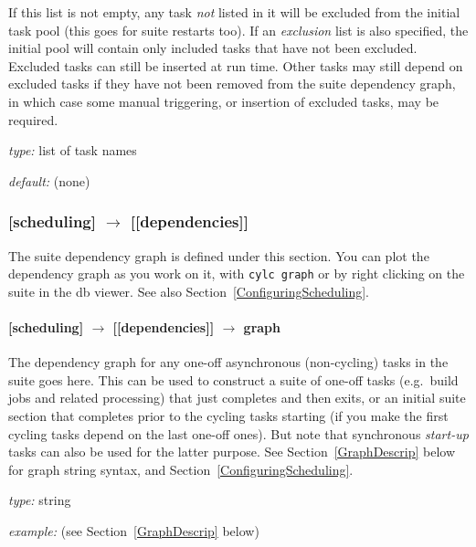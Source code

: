 If this list is not empty, any task {\em not} listed in it will be
excluded from the initial task pool (this goes for suite restarts too).
If an {\em exclusion} list is also specified, the initial pool will
contain only included tasks that have not been excluded. Excluded tasks
can still be inserted at run time. Other tasks may still depend on
excluded tasks if they have not been removed from the suite dependency
graph, in which case some manual triggering, or insertion of excluded 
tasks, may be required.

\begin{myitemize}
    \item {\em type:} list of task names
    \item {\em default:} (none)
\end{myitemize}

\subsubsection[{[[}dependencies{]]}]{[scheduling] $\rightarrow$ [[dependencies]]}

The suite dependency graph is defined under this section.  You can plot
the dependency graph as you work on it, with \lstinline=cylc graph= or
by right clicking on the suite in the db viewer.  See also 
Section~\ref{ConfiguringScheduling}.

\paragraph[graph]{ [scheduling] $\rightarrow$ [[dependencies]] $\rightarrow$ graph }

The dependency graph for any one-off asynchronous (non-cycling) tasks in
the suite goes here. This can be used to construct a suite of one-off
tasks (e.g.\ build jobs and related processing) that just completes and
then exits, or an initial suite section that completes prior to the
cycling tasks starting (if you make the first cycling tasks depend on
the last one-off ones). But note that synchronous {\em start-up} tasks
can also be used for the latter purpose.  See Section~\ref{GraphDescrip}
below for graph string syntax, and Section~\ref{ConfiguringScheduling}.
\begin{myitemize}
    \item {\em type:} string 
    \item {\em example:} (see Section~\ref{GraphDescrip} below)
\end{myitemize}
 
